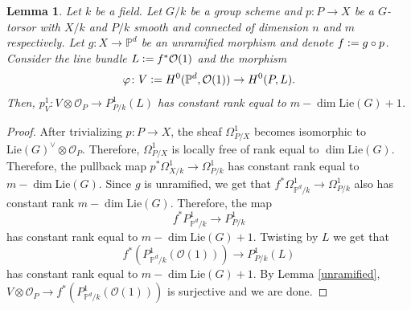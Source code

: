 \documentclass[a4paper,12pt]{amsart}
\newtheorem{lemma}[definition]{Lemma}
\numberwithin{equation}{section}
\newcommand{\defeq}{\vcentcolon=}
\renewcommand{\_}{\rule{0.25cm}{0.4pt}}
\begin{document}
\begin{lemma}\label{Bertini torsor}
    Let $k$ be a field. Let $G/k$ be a group scheme and $p\colon P\to X$ be a $G$-torsor with $X/k$ and $P/k$ smooth and connected of dimension $n$ and $m$ respectively. Let $g\colon X\to \mathbb{P}^{d}$ be an unramified morphism and denote $f\defeq g\circ p$. Consider the line bundle $L\defeq f^{\ast}\mathcal{O}(1)$ and the morphism
    \[
    \varphi\colon V\defeq H^{0}(\mathbb{P}^{d},\mathcal{O}(1))\to H^{0}(P,L).
    \]
    Then, $p^{1}_{V}\colon V\otimes \mathcal{O}_{P}\to P^{1}_{P/k}(L)$ has constant rank equal to $m-\dim\text{Lie}(G)+1$.
\end{lemma}
\begin{proof}
    After trivializing $p\colon P\to X$, the sheaf $\Omega^{1}_{P/X}$ becomes isomorphic to $\text{Lie}(G)^{\vee}\otimes \mathcal{O}_{P}$. Therefore, $\Omega^{1}_{P/X}$ is locally free of rank equal to $\dim\text{Lie}(G)$. Therefore, the pullback map $p^{\ast}\Omega^{1}_{X/k}\to \Omega^{1}_{P/k}$ has constant rank equal to $m-\dim\text{Lie}(G)$. Since $g$ is unramified, we get that $f^{\ast}\Omega^{1}_{\mathbb{P}^{d}/k}\to \Omega^{1}_{P/k}$ also has constant rank $m-\dim\text{Lie}(G)$. Therefore, the map
    \[
    f^{\ast}P^{1}_{\mathbb{P}^{d}/k}\to P^{1}_{P/k}
    \]
    has constant rank equal to $m-\dim\text{Lie}(G)+1$. Twisting by $L$ we get that
    \[
    f^{\ast}(P^{1}_{\mathbb{P}^{d}/k}(\mathcal{O}(1)))\to P^{1}_{P/k}(L)
    \]
    has constant rank equal to $m-\dim\text{Lie}(G)+1$. By Lemma \ref{unramified}, $V\otimes \mathcal{O}_{P}\to f^{\ast}(P^{1}_{\mathbb{P}^{d}/k}(\mathcal{O}(1)))$ is surjective and we are done.
\end{proof}
\end{document}

